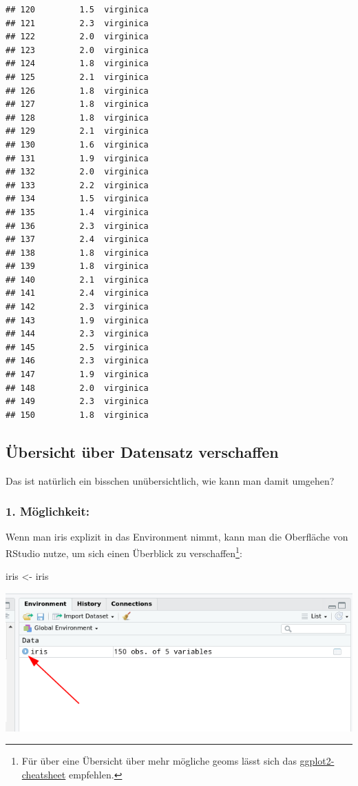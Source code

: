 \documentclass[
]{book}
\newenvironment{Shaded}{\begin{snugshade}}{\end{snugshade}}
\newcommand{\NormalTok}[1]{#1}
\newcommand{\OtherTok}[1]{\textcolor[rgb]{0.56,0.35,0.01}{#1}}
\begin{document}
\begin{verbatim}
## 120         1.5  virginica
## 121         2.3  virginica
## 122         2.0  virginica
## 123         2.0  virginica
## 124         1.8  virginica
## 125         2.1  virginica
## 126         1.8  virginica
## 127         1.8  virginica
## 128         1.8  virginica
## 129         2.1  virginica
## 130         1.6  virginica
## 131         1.9  virginica
## 132         2.0  virginica
## 133         2.2  virginica
## 134         1.5  virginica
## 135         1.4  virginica
## 136         2.3  virginica
## 137         2.4  virginica
## 138         1.8  virginica
## 139         1.8  virginica
## 140         2.1  virginica
## 141         2.4  virginica
## 142         2.3  virginica
## 143         1.9  virginica
## 144         2.3  virginica
## 145         2.5  virginica
## 146         2.3  virginica
## 147         1.9  virginica
## 148         2.0  virginica
## 149         2.3  virginica
## 150         1.8  virginica
\end{verbatim}

\hypertarget{uxfcbersicht-uxfcber-datensatz-verschaffen}{%
\subsection{Übersicht über Datensatz verschaffen}\label{uxfcbersicht-uxfcber-datensatz-verschaffen}}

Das ist natürlich ein bisschen unübersichtlich, wie kann man damit umgehen?

\hypertarget{muxf6glichkeit}{%
\subsubsection{1. Möglichkeit:}\label{muxf6glichkeit}}

Wenn man iris explizit in das Environment nimmt, kann man die Oberfläche von RStudio nutze, um sich einen Überblick zu verschaffen\footnote{Für über eine Übersicht über mehr mögliche geoms lässt sich das \href{https://raw.githubusercontent.com/rstudio/cheatsheets/master/data-visualization-2.1.pdf}{ggplot2-cheatsheet} empfehlen.}:

\begin{Shaded}
\begin{Highlighting}[]
\NormalTok{iris }\OtherTok{\textless{}{-}}\NormalTok{ iris}
\end{Highlighting}
\end{Shaded}

\begin{center}\includegraphics[width=1\linewidth]{imgs/summ1} \end{center}
\end{document}
